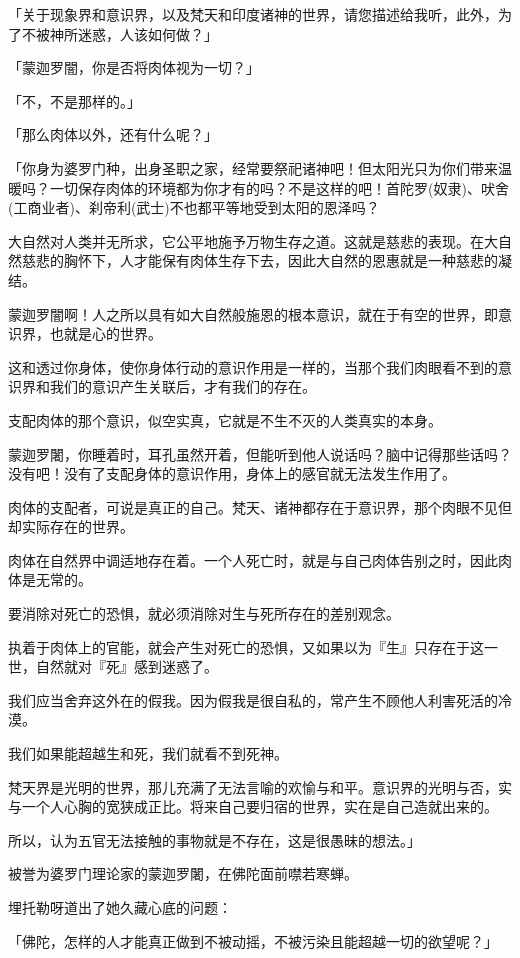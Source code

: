 \documentclass[twoside,openany]{book}
\begin{document}
「关于现象界和意识界，以及梵天和印度诸神的世界，请您描述给我听，此外，为了不被神所迷惑，人该如何做？」

「蒙迦罗闇，你是否将肉体视为一切？」

「不，不是那样的。」

「那么肉体以外，还有什么呢？」

「你身为婆罗门种，出身圣职之家，经常要祭祀诸神吧！但太阳光只为你们带来温暖吗？一切保存肉体的环境都为你才有的吗？不是这样的吧！首陀罗(奴隶)、吠舍(工商业者)、刹帝利(武士)不也都平等地受到太阳的恩泽吗？

大自然对人类并无所求，它公平地施予万物生存之道。这就是慈悲的表现。在大自然慈悲的胸怀下，人才能保有肉体生存下去，因此大自然的恩惠就是一种慈悲的凝结。

蒙迦罗闇啊！人之所以具有如大自然般施恩的根本意识，就在于有空的世界，即意识界，也就是心的世界。

这和透过你身体，使你身体行动的意识作用是一样的，当那个我们肉眼看不到的意识界和我们的意识产生关联后，才有我们的存在。

支配肉体的那个意识，似空实真，它就是不生不灭的人类真实的本身。

蒙迦罗闍，你睡着时，耳孔虽然开着，但能听到他人说话吗？脑中记得那些话吗？没有吧！没有了支配身体的意识作用，身体上的感官就无法发生作用了。

肉体的支配者，可说是真正的自己。梵天、诸神都存在于意识界，那个肉眼不见但却实际存在的世界。

肉体在自然界中调适地存在着。一个人死亡时，就是与自己肉体告别之时，因此肉体是无常的。

要消除对死亡的恐惧，就必须消除对生与死所存在的差别观念。

执着于肉体上的官能，就会产生对死亡的恐惧，又如果以为『生』只存在于这一世，自然就对『死』感到迷惑了。

我们应当舍弃这外在的假我。因为假我是很自私的，常产生不顾他人利害死活的冷漠。

我们如果能超越生和死，我们就看不到死神。

梵天界是光明的世界，那儿充满了无法言喻的欢愉与和平。意识界的光明与否，实与一个人心胸的宽狭成正比。将来自己要归宿的世界，实在是自己造就出来的。

所以，认为五官无法接触的事物就是不存在，这是很愚昧的想法。」

被誉为婆罗门理论家的蒙迦罗闍，在佛陀面前噤若寒蝉。

埋托勒呀道出了她久藏心底的问题：

「佛陀，怎样的人才能真正做到不被动摇，不被污染且能超越一切的欲望呢？」
\end{document}
